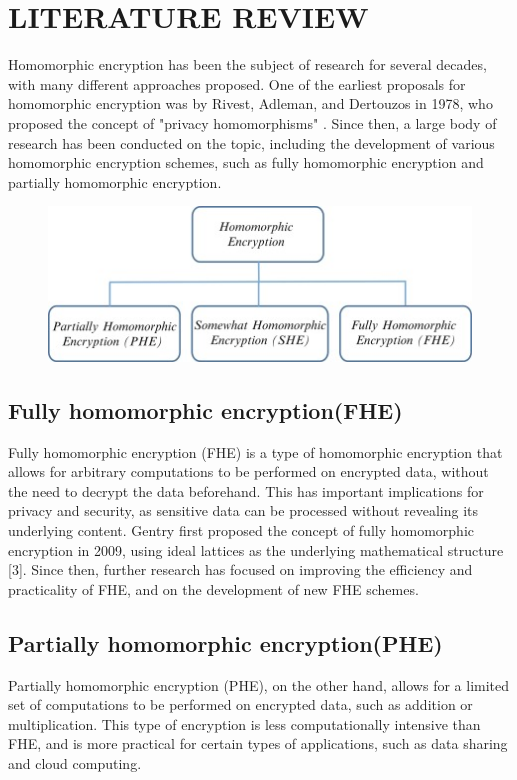 \documentclass[a4paper,11pt]{report}
\begin{document}
\chapter{LITERATURE REVIEW}
Homomorphic encryption has been the subject of research for several decades, with many different approaches proposed. One of the earliest proposals for homomorphic encryption was by Rivest, Adleman, and Dertouzos in 1978, who proposed the concept of "privacy homomorphisms" . Since then, a large body of research has been conducted on the topic, including the development of various homomorphic encryption schemes, such as fully homomorphic encryption and partially homomorphic encryption.
\begin{figure}[h]
	\centering
	\hspace{21pt}
	\includegraphics[width=.70\linewidth]{type.jpg}
	\label{fig:type.png}
\end{figure}
\section{Fully homomorphic encryption(FHE)}
Fully homomorphic encryption (FHE) is a type of homomorphic encryption that allows for arbitrary computations to be performed on encrypted data, without the need to decrypt the data beforehand. This has important implications for privacy and security, as sensitive data can be processed without revealing its underlying content. Gentry first proposed the concept of fully homomorphic encryption in 2009, using ideal lattices as the underlying mathematical structure [3]. Since then, further research has focused on improving the efficiency and practicality of FHE, and on the development of new FHE schemes.
\section{Partially homomorphic encryption(PHE)}\label{AA}
Partially homomorphic encryption (PHE), on the other hand, allows for a limited set of computations to be performed on encrypted data, such as addition or multiplication. This type of encryption is less computationally intensive than FHE, and is more practical for certain types of applications, such as data sharing and cloud computing.
  
\end{document}
